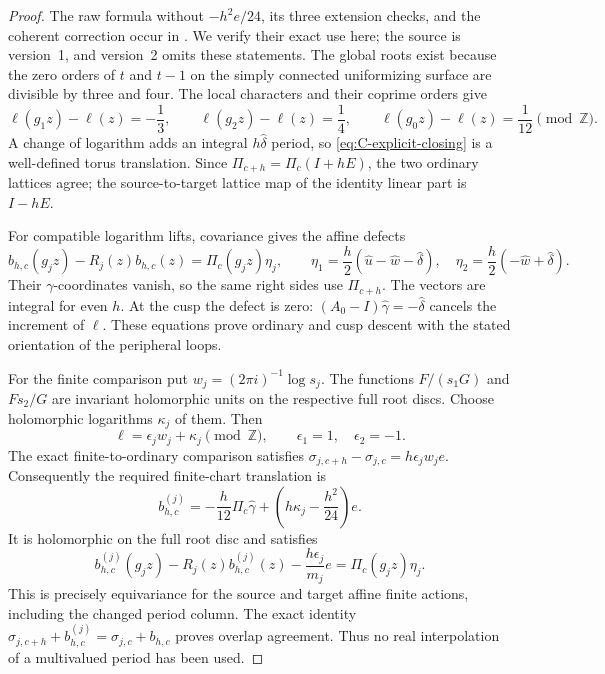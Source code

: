 \begin{proof}
The raw formula without \(-h^2e/24\), its three extension checks,
and the coherent correction occur in
\cite[\texttt{p2:prop:global-even-shift} and the subsequent
orbit-groupoid calculations]{DGKXv1push}. We verify their exact use
here; the source is version~1, and version~2 omits these statements.
The global roots exist because the zero orders of \(t\) and \(t-1\)
on the simply connected uniformizing surface are divisible by three
and four. The local characters and their coprime orders give
\[
 \ell(g_1z)-\ell(z)=-\frac13,\qquad
 \ell(g_2z)-\ell(z)=\frac14,\qquad
 \ell(g_0z)-\ell(z)=\frac1{12}\pmod{\mathbb Z}.
\]
A change of logarithm adds an integral \(h\widehat\delta\) period,
so \eqref{eq:C-explicit-closing} is a well-defined torus translation.
Since \(\Pi_{c+h}=\Pi_c(I+hE)\), the two ordinary lattices agree;
the source-to-target lattice map of the identity linear part is
\(I-hE\).

For compatible logarithm lifts, covariance gives the affine defects
\[
 b_{h,c}(g_jz)-R_j(z)b_{h,c}(z)
       =\Pi_c(g_jz)\eta_j,\qquad
 \eta_1=\frac h2(\widehat u-\widehat w-\widehat\delta),\quad
 \eta_2=\frac h2(-\widehat w+\widehat\delta).
\]
Their \(\gamma\)-coordinates vanish, so the same right sides use
\(\Pi_{c+h}\). The vectors are integral for even \(h\). At the
cusp the defect is zero: \((A_0-I)\widehat\gamma=-\widehat\delta\)
cancels the increment of \(\ell\). These equations prove ordinary
and cusp descent with the stated orientation of the peripheral
loops.

For the finite comparison put \(w_j=(2\pi i)^{-1}\log s_j\).
The functions \(F/(s_1G)\) and \(Fs_2/G\) are invariant
holomorphic units on the respective full root discs. Choose
holomorphic logarithms \(\kappa_j\) of them. Then
\[
 \ell=\epsilon_jw_j+\kappa_j\pmod{\mathbb Z},\qquad
 \epsilon_1=1,\quad\epsilon_2=-1.
\]
The exact finite-to-ordinary comparison satisfies
\(\sigma_{j,c+h}-\sigma_{j,c}=h\epsilon_jw_je\).
Consequently the required finite-chart translation is
\[
 b^{(j)}_{h,c}
 =-\frac h{12}\Pi_c\widehat\gamma
       +\left(h\kappa_j-\frac{h^2}{24}\right)e.
\]
It is holomorphic on the full root disc and satisfies
\[
 b^{(j)}_{h,c}(g_jz)-R_j(z)b^{(j)}_{h,c}(z)
       -\frac{h\epsilon_j}{m_j}e
 =\Pi_c(g_jz)\eta_j.
\]
This is precisely equivariance for the source and target affine
finite actions, including the changed period column. The exact
identity
\(\sigma_{j,c+h}+b^{(j)}_{h,c}
=\sigma_{j,c}+b_{h,c}\) proves overlap agreement. Thus no real
interpolation of a multivalued period has been used.


\end{proof}
